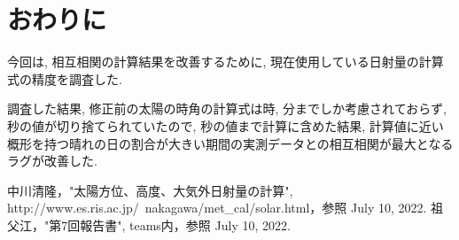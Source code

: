 \documentclass[a4j,12pt,]{jarticle}
\begin{document}
\section{おわりに}
今回は, 相互相関の計算結果を改善するために, 現在使用している日射量の計算式の精度を調査した.

調査した結果, 修正前の太陽の時角の計算式は時, 分までしか考慮されておらず, 秒の値が切り捨てられていたので, 秒の値まで計算に含めた結果, 計算値に近い概形を持つ晴れの日の割合が大きい期間の実測データとの相互相関が最大となるラグが改善した.

\begin{thebibliography}{5}
  中川清隆，"太陽方位、高度、大気外日射量の計算", http://www.es.ris.ac.jp/~nakagawa/met\_cal/solar.html，参照 July 10, 2022.
  祖父江，"第7回報告書", teams内，参照 July 10, 2022.
\end{thebibliography}
\end{document}
